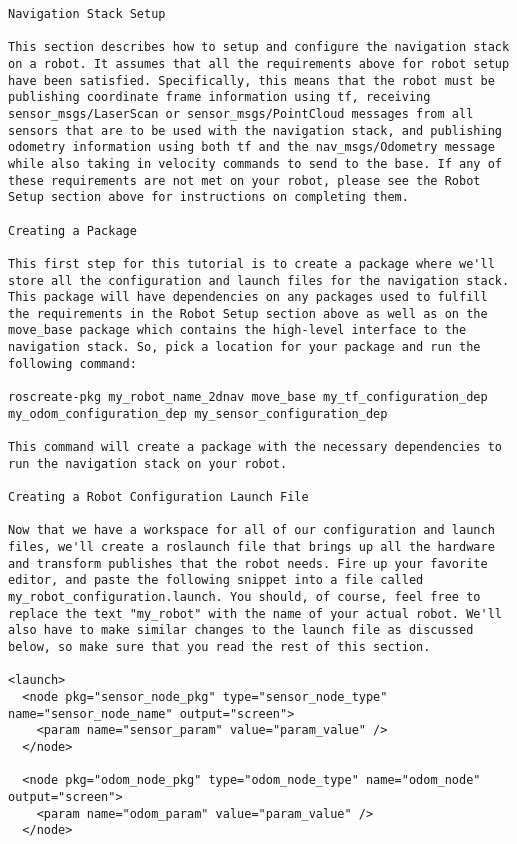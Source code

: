 \begin{verbatim}
Navigation Stack Setup

This section describes how to setup and configure the navigation stack on a robot. It assumes that all the requirements above for robot setup have been satisfied. Specifically, this means that the robot must be publishing coordinate frame information using tf, receiving sensor_msgs/LaserScan or sensor_msgs/PointCloud messages from all sensors that are to be used with the navigation stack, and publishing odometry information using both tf and the nav_msgs/Odometry message while also taking in velocity commands to send to the base. If any of these requirements are not met on your robot, please see the Robot Setup section above for instructions on completing them.

Creating a Package

This first step for this tutorial is to create a package where we'll store all the configuration and launch files for the navigation stack. This package will have dependencies on any packages used to fulfill the requirements in the Robot Setup section above as well as on the move_base package which contains the high-level interface to the navigation stack. So, pick a location for your package and run the following command:

roscreate-pkg my_robot_name_2dnav move_base my_tf_configuration_dep my_odom_configuration_dep my_sensor_configuration_dep

This command will create a package with the necessary dependencies to run the navigation stack on your robot.

Creating a Robot Configuration Launch File

Now that we have a workspace for all of our configuration and launch files, we'll create a roslaunch file that brings up all the hardware and transform publishes that the robot needs. Fire up your favorite editor, and paste the following snippet into a file called my_robot_configuration.launch. You should, of course, feel free to replace the text "my_robot" with the name of your actual robot. We'll also have to make similar changes to the launch file as discussed below, so make sure that you read the rest of this section.

<launch>
  <node pkg="sensor_node_pkg" type="sensor_node_type" name="sensor_node_name" output="screen">
    <param name="sensor_param" value="param_value" />
  </node>

  <node pkg="odom_node_pkg" type="odom_node_type" name="odom_node" output="screen">
    <param name="odom_param" value="param_value" />
  </node>


\end{verbatim}
